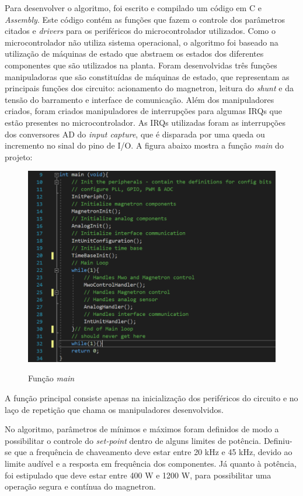 Para desenvolver o algoritmo, foi escrito e compilado um código em C e \textit{Assembly}. Este código contém as funções que fazem o controle dos parâmetros citados e \textit{drivers} para os periféricos do microcontrolador utilizados. Como o microcontrolador não utiliza sistema operacional, o algoritmo foi baseado na utilização de máquinas de estado que abstraem os estados dos diferentes componentes que são utilizados na planta. Foram desenvolvidas três funções manipuladoras que são constituídas de máquinas de estado, que representam as principais funções dos circuito: acionamento do magnetron, leitura do \textit{shunt} e da tensão do barramento e interface de comunicação. Além dos manipuladores criados, foram criados manipuladores de interrupções para algumas IRQs que estão presentes no microcontrolador. As IRQs utilizadas foram as interrupções dos conversores AD do \textit{input capture}, que é disparada por uma queda ou incremento no sinal do pino de I/O. A figura abaixo mostra a função \textit{main} do projeto:

\begin{figure}[H]
    \centering
    \caption{Função \textit{main}}
    \includegraphics[width=1\textwidth]{./dados/figuras/func_main}
    \label{fig:figura-func-main}
\end{figure}

A função principal consiste apenas na inicialização dos periféricos do circuito e no laço de repetição que chama os manipuladores desenvolvidos.

No algoritmo, parâmetros de mínimos e máximos foram definidos de modo a possibilitar o controle do \textit{set-point} dentro de alguns limites de potência. Definiu-se que a frequência de chaveamento deve estar entre 20 kHz e 45 kHz, devido ao limite audível e a resposta em frequência dos componentes. Já quanto à potência, foi estipulado que deve estar entre 400 W e 1200 W, para possibilitar uma operação segura e contínua do magnetron.

